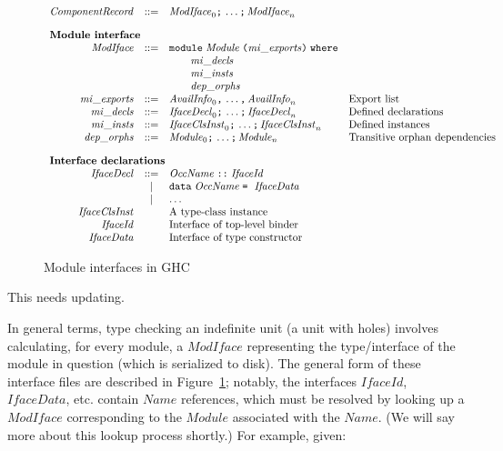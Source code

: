 \documentclass{article}
\newcommand{\I}[1]{\ensuremath{\mathit{#1}}}
\newcommand{\Red}[1]{{\color{red} #1}}
\begin{document}
\begin{figure}[htpb]
$$
\begin{array}{rcll}
\I{ComponentRecord} & ::= & \I{ModIface}_0 \verb|;|\, \ldots\verb|;|\, \I{ModIface}_n \\[1em]
\multicolumn{3}{l}{\mbox{\bf Module interface}} \\
\I{ModIface} & ::= & \verb|module| \; \I{Module} \; \verb|(| \I{mi\_exports} \verb|)| \; \verb|where| \\
& & \qquad \I{mi\_decls} \\
& & \qquad \I{mi\_insts} \\
& & \qquad \I{dep\_orphs} \\
\I{mi\_exports} & ::= & \I{AvailInfo}_0 \verb|,|\, \ldots \verb|,|\, \I{AvailInfo}_n & \mbox{Export list} \\
\I{mi\_decls} & ::= & \I{IfaceDecl}_0 \verb|;|\, \ldots \verb|;|\, \I{IfaceDecl}_n & \mbox{Defined declarations} \\
\I{mi\_insts} & ::= & \I{IfaceClsInst}_0 \verb|;|\, \ldots \verb|;|\, \I{IfaceClsInst}_n & \mbox{Defined instances} \\
\I{dep\_orphs} & ::= & \I{Module}_0 \verb|;|\, \ldots \verb|;|\, \I{Module}_n & \mbox{Transitive orphan dependencies} \\[1em]
\multicolumn{3}{l}{\mbox{\bf Interface declarations}} \\
\I{IfaceDecl} & ::= & \I{OccName} \; \verb|::| \; \I{IfaceId} \\
              & |   & \verb|data| \; \I{OccName} \; \verb|=| \;\ \I{IfaceData} \\
              & |   & \ldots \\
\I{IfaceClsInst} & & \mbox{A type-class instance} \\
\I{IfaceId} & & \mbox{Interface of top-level binder} \\
\I{IfaceData} & & \mbox{Interface of type constructor} \\
\end{array}
$$
\caption{Module interfaces in GHC} \label{fig:typecheck}
\end{figure}

\Red{This needs updating.}

In general terms,
type checking an indefinite unit (a unit with holes) involves
calculating, for every module, a \I{ModIface} representing the
type/interface of the module in question (which is serialized
to disk).  The general form of these
interface files are described in Figure~\ref{fig:typecheck}; notably,
the interfaces \I{IfaceId}, \I{IfaceData}, etc. contain \I{Name} references,
which must be resolved by
looking up a \I{ModIface} corresponding to the \I{Module} associated
with the \I{Name}. (We will say more about this lookup process shortly.)
For example, given:
\end{document}
